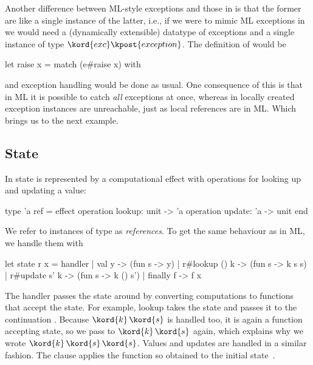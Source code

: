 Another difference between ML-style exceptions and those in \eff is that the former are like a single instance of the latter, i.e., if we were to mimic ML exceptions in \eff we would need a (dynamically extensible) datatype of exceptions  and a single instance  of type $\kord{exc} \kpost{exception}$. The definition of  would be
%
\begin{source}
let raise x = match (e#raise x) with
\end{source}
%
and exception handling would be done as usual.
One consequence of this is that in ML it is possible to catch \emph{all} exceptions at once, whereas in \eff locally created exception instances are unreachable, just as local references are in ML. Which brings us to the next example.


\subsection{State}
\label{sec:state}

In \eff state is represented by a computational effect with operations for looking up and updating a value:
%
\begin{source}
type 'a ref = effect
  operation lookup: unit -> 'a
  operation update: 'a -> unit
end
\end{source}
%
We refer to instances of type  as \emph{references}. To get the same behaviour as in ML, we handle them with
%
\begin{source}
let state r x = handler
  | val y -> (fun s -> y)
  | r#lookup () k -> (fun s -> k s s)
  | r#update s' k -> (fun s -> k () s')
  | finally f -> f x
\end{source}
%
The handler passes the state around by converting computations to functions that accept the state. For example, lookup takes the state  and passes it to the continuation . Because $\kord{k}\,\kord{s}$ is handled too, it is again a function accepting state, so we pass  to $\kord{k}\,\kord{s}$ again, which explains why we wrote $\kord{k}\,\kord{s}\,\kord{s}$. Values and updates are handled in a similar fashion. The  clause applies the function so obtained to the initial state~.

